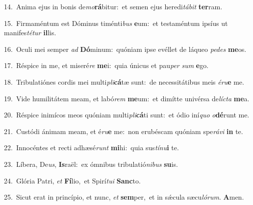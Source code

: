 {\numbfont\textcolor{\numbcolor}{14.}}~Anima ejus in bonis de\-\textit{mo}\-\textbf{rá}bitur:~\star et semen ejus heredi\-\textit{tá}\-\textit{bit} \textbf{ter}\-ram.\par
{\numbfont\textcolor{\numbcolor}{15.}}~Firmaméntum est Dóminus timénti\textit{bus} \textbf{e}\-um:~\star et testaméntum ipsíus ut manifes\-\textit{té}\-\textit{tur} \textbf{il}\-lis.\par
{\numbfont\textcolor{\numbcolor}{16.}}~Oculi mei semper \textit{ad} \textbf{Dó}\-minum:~\star quóniam ipse evéllet de láqueo \textit{pe}\-\textit{des} \textbf{me}\-os.\par
{\numbfont\textcolor{\numbcolor}{17.}}~Réspice in me, et miseré\textit{re} \textbf{me}\-i:~\star quia únicus et pau\textit{per} \textit{sum} \textbf{e}\-go.\par
{\numbfont\textcolor{\numbcolor}{18.}}~Tribulatiónes cordis mei multi\-\textit{pli}\-\textbf{cá}tæ sunt:~\star de necessitátibus meis \textit{é}\-\textit{ru}\textbf{e} me.\par
{\numbfont\textcolor{\numbcolor}{19.}}~Vide humilitátem meam, et labó\textit{rem} \textbf{me}\-um:~\star et dimítte univérsa de\-\textit{líc}\-\textit{ta} \textbf{me}\-a.\par
{\numbfont\textcolor{\numbcolor}{20.}}~Réspice inimícos meos quóniam multi\-\textit{pli}\-\textbf{cá}ti sunt:~\star et ódio iní\textit{quo} \textit{o}\-\textbf{dé}runt me.\par
{\numbfont\textcolor{\numbcolor}{21.}}~Custódi ánimam meam, et é\-\textit{ru}\-\textbf{e} me:~\star non erubéscam quóniam spe\-\textit{rá}\-\textit{vi} \textbf{in} te.\par
{\numbfont\textcolor{\numbcolor}{22.}}~Innocéntes et recti adhæsé\textit{runt} \textbf{mi}\-hi:~\star quia sus\-\textit{tí}\-\textit{nu}\textbf{i} te.\par
{\numbfont\textcolor{\numbcolor}{23.}}~Líbera, De\-\textit{us}\-, \textbf{Is}\-raël:~\star ex ómnibus tribulatió\-\textit{ni}\-\textit{bus} \textbf{su}\-is.\par
{\numbfont\textcolor{\numbcolor}{24.}}~Glória Patri, \textit{et} \textbf{Fí}\-lio,~\star et Spirí\-\textit{tu}\-\textit{i} \textbf{Sanc}\-to.\par
{\numbfont\textcolor{\numbcolor}{25.}}~Sicut erat in princípio, et nunc, \textit{et} \textbf{sem}\-per,~\star et in sǽcula sæcu\-\textit{ló}\-\textit{rum}. \textbf{A}\-men.\par

